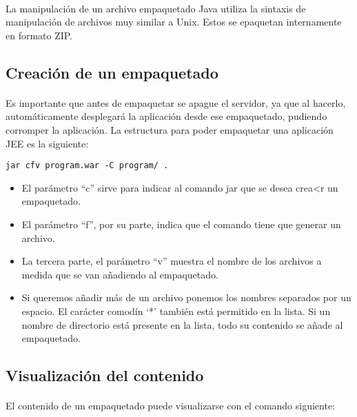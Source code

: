 \documentclass{article}
\begin{document}
	\paragraph{}La manipulación de un archivo empaquetado Java utiliza la sintaxis de manipulación de archivos muy similar a Unix. Estos se epaquetan internamente en formato ZIP.
	
	\subsection{Creación de un empaquetado}
	
	\paragraph{}Es importante que antes de empaquetar se apague el servidor, ya que al hacerlo, automáticamente desplegará la aplicación desde ese empaquetado, pudiendo corromper la aplicación. La estructura para poder empaquetar una aplicación JEE es la siguiente:
	
	\begin{center}
		\texttt{jar cfv program.war -C program/ .}
	\end{center}

	\begin{itemize}
		\item El parámetro ``c'' sirve para indicar al comando jar que se desea crea<r un empaquetado.
		\item El parámetro ``f'', por su parte, indica que el comando tiene que generar un archivo.
		\item La tercera parte, el parámetro ``v'' muestra el nombre de los archivos a medida que se van añadiendo al empaquetado.
		\item Si queremos añadir más de un archivo ponemos los nombres separados por un espacio. El carácter comodín `*' también está permitido en la lista. Si un nombre de directorio está presente en la lista, todo su contenido se añade al empaquetado.
	\end{itemize} 
	
	\subsection{Visualización del contenido}
	
	\paragraph{}El contenido de un empaquetado puede visualizarse con el comando siguiente:
	
\end{document}
